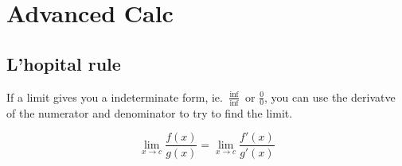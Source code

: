 \documentclass[../main.tex]{subfiles}
\begin{document}
\section{Advanced Calc}


\subsection{L'hopital rule}

If a limit gives you a indeterminate form, ie. $\frac{\inf}{\inf}$ or $\frac{0}{0}$, you can use the derivatve of the numerator and denominator to try to find the limit.

\[ \lim_{x \to c} \frac{f(x)}{g(x)} = \lim_{x \to c} \frac{f'(x)}{g'(x)} \]
\end{document}
